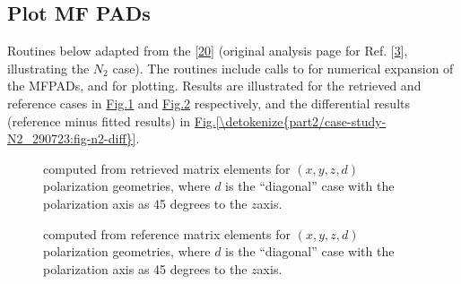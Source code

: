 \documentclass[letterpaper,table,10pt,english]{jupyterBook}
\begin{document}
\subsection{Plot MF PADs}
\label{\detokenize{part2/case-study-N2_290723:plot-mf-pads}}
\sphinxAtStartPar
Routines below adapted from the  {[}\hyperlink{cite.backmatter/bibliography:id681}{20}{]}  (original analysis page for Ref. {[}\hyperlink{cite.backmatter/bibliography:id686}{3}{]}, illustrating the \(N_2\) case). The routines include calls to  for numerical expansion of the MF\sphinxhyphen{}PADs, and  for plotting. Results are illustrated for the retrieved and reference cases in \hyperref[\detokenize{part2/case-study-N2_290723:fig-n2-compc}]{Fig.\@ \ref{\detokenize{part2/case-study-N2_290723:fig-n2-compc}}} and \hyperref[\detokenize{part2/case-study-N2_290723:fig-n2-ref}]{Fig.\@ \ref{\detokenize{part2/case-study-N2_290723:fig-n2-ref}}} respectively, and the differential results (reference minus fitted results) in \hyperref[\detokenize{part2/case-study-N2_290723:fig-n2-diff}]{Fig.\@ \ref{\detokenize{part2/case-study-N2_290723:fig-n2-diff}}}.

\begin{figure}[htbp]
\centering
\capstart

\noindent{}
\caption{{\hyperref[\detokenize{backmatter/glossary:term-MF}]{}} computed from retrieved matrix elements for \((x,y,z,d)\) polarization geometries, where \(d\) is the “diagonal” case with the polarization axis as 45 degrees to the \(z\)\sphinxhyphen{}axis.}\label{\detokenize{part2/case-study-N2_290723:fig-n2-compc}}\end{figure}

\begin{figure}[htbp]
\centering
\capstart

\noindent{}
\caption{{\hyperref[\detokenize{backmatter/glossary:term-MF}]{}} computed from reference  matrix elements for \((x,y,z,d)\) polarization geometries, where \(d\) is the “diagonal” case with the polarization axis as 45 degrees to the \(z\)\sphinxhyphen{}axis.}\label{\detokenize{part2/case-study-N2_290723:fig-n2-ref}}\end{figure}
\end{document}
